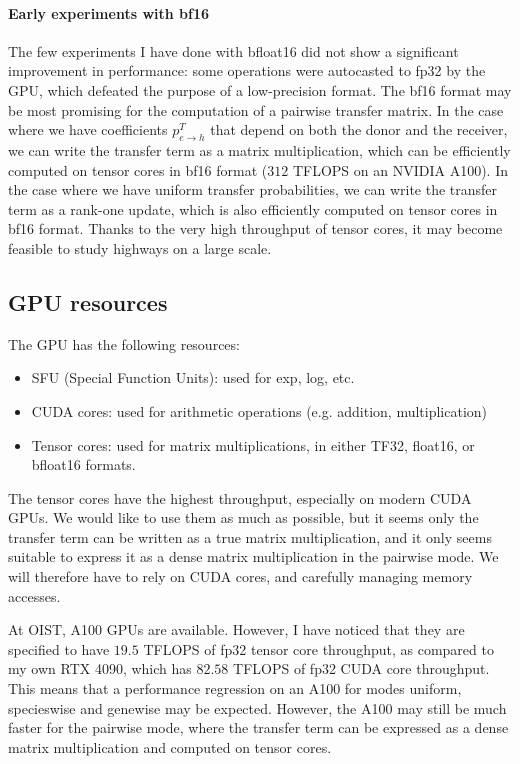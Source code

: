\documentclass{article}
\newcommand{\1}{\mathbf{1}}
\begin{document}
\paragraph{Early experiments with bf16}
The few experiments I have done with bfloat16 did not show a significant improvement in performance: some operations were autocasted to fp32 by the GPU, which defeated the purpose of a low-precision format. The bf16 format may be most promising for the computation of a pairwise transfer matrix. In the case where we have coefficients $p^T_{e\to h}$ that depend on both the donor and the receiver, we can write the transfer term as a matrix multiplication, which can be efficiently computed on tensor cores in bf16 format ($312$ TFLOPS on an NVIDIA A100). In the case where we have uniform transfer probabilities, we can write the transfer term as a rank-one update, which is also efficiently computed on tensor cores in bf16 format. Thanks to the very high throughput of tensor cores, it may become feasible to study highways on a large scale.

\subsection{GPU resources}
The GPU has the following resources:
\begin{itemize}
    \item SFU (Special Function Units): used for exp, log, etc.
    \item CUDA cores: used for arithmetic operations (e.g. addition, multiplication)
    \item Tensor cores: used for matrix multiplications, in either TF32, float16, or bfloat16 formats. 
\end{itemize}
The tensor cores have the highest throughput, especially on modern CUDA GPUs. We would like to use them as much as possible, but it seems only the transfer term can be written as a true matrix multiplication, and it only seems suitable to express it as a dense matrix multiplication in the pairwise mode. We will therefore have to rely on CUDA cores, and carefully managing memory accesses.

At OIST, A100 GPUs are available. However, I have noticed that they are specified to have $19.5$ TFLOPS of fp32 tensor core throughput, as compared to my own RTX 4090, which has $82.58$ TFLOPS of fp32 CUDA core throughput. This means that a performance regression on an A100 for modes uniform, specieswise and genewise may be expected. However, the A100 may still be much faster for the pairwise mode, where the transfer term can be expressed as a dense matrix multiplication and computed on tensor cores.
\end{document}

